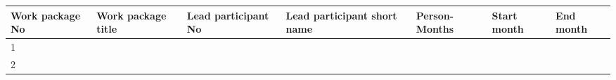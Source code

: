 \documentclass[]{article}
\begin{document}
\begin{longtable}[]{@{}lllllll@{}}
\toprule
\begin{minipage}[b]{0.11\columnwidth}\raggedright
Work package No\strut
\end{minipage} & \begin{minipage}[b]{0.13\columnwidth}\raggedright
Work package title\strut
\end{minipage} & \begin{minipage}[b]{0.14\columnwidth}\raggedright
Lead participant No\strut
\end{minipage} & \begin{minipage}[b]{0.19\columnwidth}\raggedright
Lead participant short name\strut
\end{minipage} & \begin{minipage}[b]{0.09\columnwidth}\raggedright
Person-Months\strut
\end{minipage} & \begin{minipage}[b]{0.08\columnwidth}\raggedright
Start month\strut
\end{minipage} & \begin{minipage}[b]{0.07\columnwidth}\raggedright
End month\strut
\end{minipage}\tabularnewline
\midrule
\endhead
\begin{minipage}[t]{0.11\columnwidth}\raggedright
1\strut
\end{minipage} & \begin{minipage}[t]{0.13\columnwidth}\raggedright
\strut
\end{minipage} & \begin{minipage}[t]{0.14\columnwidth}\raggedright
\strut
\end{minipage} & \begin{minipage}[t]{0.19\columnwidth}\raggedright
\strut
\end{minipage} & \begin{minipage}[t]{0.09\columnwidth}\raggedright
\strut
\end{minipage} & \begin{minipage}[t]{0.08\columnwidth}\raggedright
\strut
\end{minipage} & \begin{minipage}[t]{0.07\columnwidth}\raggedright
\strut
\end{minipage}\tabularnewline
\begin{minipage}[t]{0.11\columnwidth}\raggedright
2\strut
\end{minipage} & \begin{minipage}[t]{0.13\columnwidth}\raggedright

\end{minipage}
\end{longtable}
\end{document}
